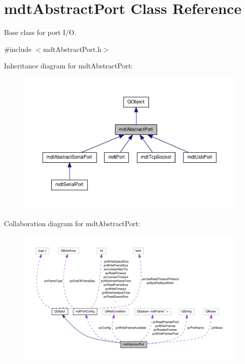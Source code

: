 \hypertarget{classmdt_abstract_port}{\section{mdt\-Abstract\-Port Class Reference}
\label{classmdt_abstract_port}
}


Base class for port I/\-O.  




{\ttfamily \#include $<$mdt\-Abstract\-Port.\-h$>$}



Inheritance diagram for mdt\-Abstract\-Port\-:\nopagebreak
\begin{figure}[H]
\begin{center}
\leavevmode
\includegraphics[width=350pt]{classmdt_abstract_port__inherit__graph}
\end{center}
\end{figure}


Collaboration diagram for mdt\-Abstract\-Port\-:\nopagebreak
\begin{figure}[H]
\begin{center}
\leavevmode
\includegraphics[width=350pt]{classmdt_abstract_port__coll__graph}
\end{center}
\end{figure}
